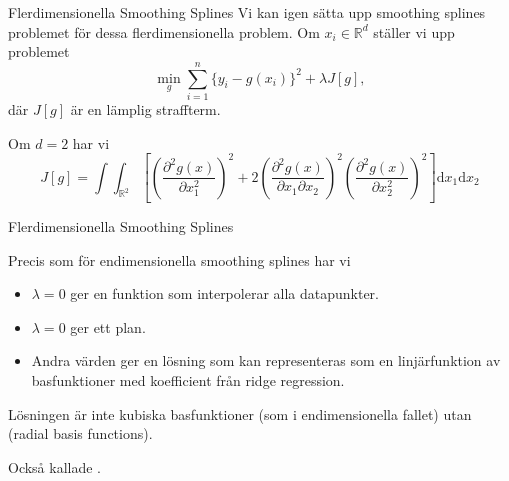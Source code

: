 \documentclass[10pt,english]{beamer}
\begin{document}
\begin{frame}{Flerdimensionella Smoothing Splines}
    Vi kan igen sätta upp smoothing splines problemet för dessa flerdimensionella problem. Om $x_i \in \mathbb{R}^d$ ställer vi upp problemet
    \begin{equation*}
        \min_g \sum_{i=1}^{n}\{y_i - g(x_i)\}^2 + \lambda J[g],
    \end{equation*}
    där $J[g]$ är en lämplig straffterm.

    Om $d=2$ har vi
    \begin{equation*}
        J[g] = \int \int_{\mathbb{R}^2} \left[ \left( \frac{\partial^2 g(x)}{\partial x_1^2}\right)^2 + 2 \left(\frac{\partial^2 g(x)}{\partial x_1 \partial x_2}\right)^2 \left(\frac{\partial^2 g(x)}{\partial x_2^2}\right)^2  \right] \mathrm{d}x_1 \mathrm{d} x_2
    \end{equation*}
\end{frame}

\begin{frame}{Flerdimensionella Smoothing Splines}

    Precis som för endimensionella smoothing splines har vi
    \begin{itemize}
        \item $\lambda = 0$ ger en funktion som interpolerar alla datapunkter.
        \item $\lambda = 0$ ger ett plan.
        \item Andra värden ger en lösning som kan representeras som en linjärfunktion av basfunktioner med koefficient från ridge regression.
    \end{itemize}

    Lösningen är inte kubiska basfunktioner (som i endimensionella fallet) utan  (radial basis functions).

    Också kallade .
    
\end{frame}
\end{document}
